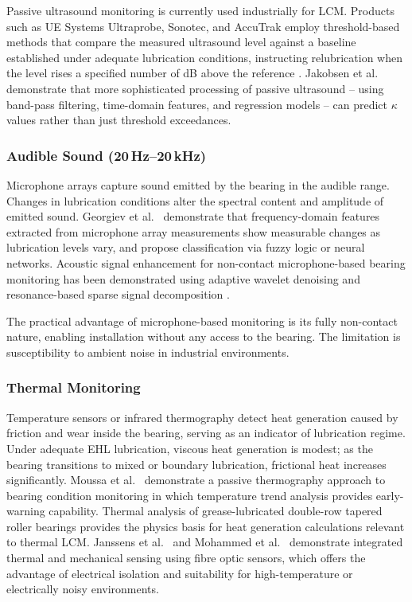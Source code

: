 Passive ultrasound monitoring is currently used industrially for LCM. Products such as UE Systems Ultraprobe, Sonotec, and AccuTrak employ threshold-based methods that compare the measured ultrasound level against a baseline established under adequate lubrication conditions, instructing relubrication when the level rises a specified number of dB above the reference \cite{lineham_ultrasonic_2008}. Jakobsen et al.\ \cite{jakobsen_detecting_2023} demonstrate that more sophisticated processing of passive ultrasound -- using band-pass filtering, time-domain features, and regression models -- can predict $\kappa$ values rather than just threshold exceedances.

\subsubsection{Audible Sound (20\,Hz--20\,kHz)}
\label{subsubsec:sound}
Microphone arrays capture sound emitted by the bearing in the audible range. Changes in lubrication conditions alter the spectral content and amplitude of emitted sound. Georgiev et al.\ \cite{georgiev_microphone_2017} demonstrate that frequency-domain features extracted from microphone array measurements show measurable changes as lubrication levels vary, and propose classification via fuzzy logic or neural networks. Acoustic signal enhancement for non-contact microphone-based bearing monitoring has been demonstrated using adaptive wavelet denoising \cite{pacheco-cherrez_bearing_2022} and resonance-based sparse signal decomposition \cite{herwig_signal_2025}.

The practical advantage of microphone-based monitoring is its fully non-contact nature, enabling installation without any access to the bearing. The limitation is susceptibility to ambient noise in industrial environments.

\subsubsection{Thermal Monitoring}
\label{subsubsec:thermal}
Temperature sensors or infrared thermography detect heat generation caused by friction and wear inside the bearing, serving as an indicator of lubrication regime. Under adequate EHL lubrication, viscous heat generation is modest; as the bearing transitions to mixed or boundary lubrication, frictional heat increases significantly. Moussa et al.\ \cite{moussa_passive_2017} demonstrate a passive thermography approach to bearing condition monitoring in which temperature trend analysis provides early-warning capability. Thermal analysis of grease-lubricated double-row tapered roller bearings \cite{yan_thermal_2019} provides the physics basis for heat generation calculations relevant to thermal LCM. Janssens et al.\ \cite{janssens_thermal_2015} and Mohammed et al.\ \cite{mohammed_electric_2021} demonstrate integrated thermal and mechanical sensing using fibre optic sensors, which offers the advantage of electrical isolation and suitability for high-temperature or electrically noisy environments.

